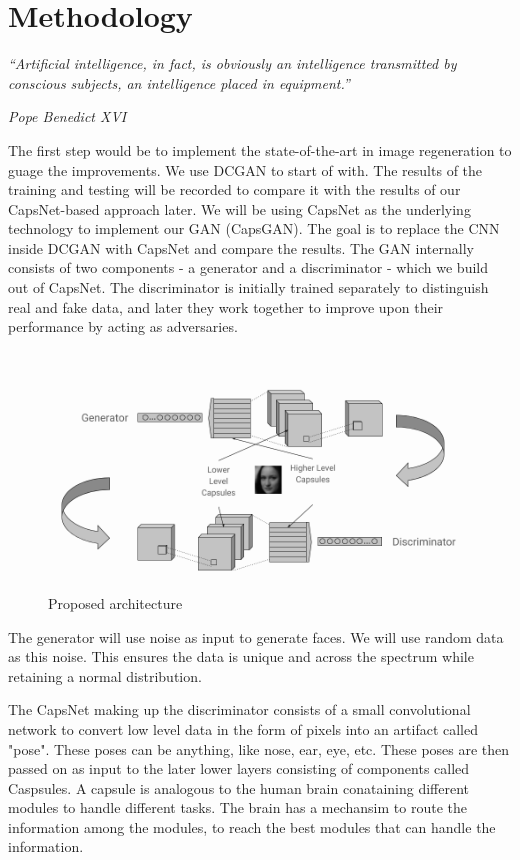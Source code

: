 \chapter{Methodology}\label{ch:methodology}
\epigraph{\textit{\Large “Artificial intelligence, in fact, is obviously an intelligence transmitted by conscious subjects, an intelligence placed in equipment.”}}{\textit{ \large Pope Benedict XVI}}

The first step would be to implement the state-of-the-art in image regeneration to guage the improvements. We use DCGAN to start of with. The results of the training and testing will be recorded to compare it with the results of our CapsNet-based approach later. We will be using CapsNet as the underlying technology to implement our GAN (CapsGAN). The goal is to replace the CNN inside DCGAN with CapsNet and compare the results. The GAN internally consists of two components - a generator and a discriminator - which we build out of CapsNet. The discriminator is initially trained separately to distinguish real and fake data, and later they work together to improve upon their performance by acting as adversaries.
\par\bigskip

\begin{figure}[H]
\centering\includegraphics[width=1\textwidth]{images/methodology.png}
\caption{Proposed architecture}
\end{figure}

The generator will use noise as input to generate faces. We will use random data as this noise. This ensures the data is unique and across the spectrum while retaining a normal distribution.
\par\bigskip

The CapsNet making up the discriminator consists of a small convolutional network to convert low level data in the form of pixels into an artifact called "pose". These poses can be anything, like nose, ear, eye, etc. These poses are then passed on as input to the later lower layers consisting of components called Caspsules. A capsule is analogous to the human brain conataining different modules to handle different tasks. The brain has a mechansim to route the information among the modules, to reach the best modules that can handle the information.
\par\bigskip

